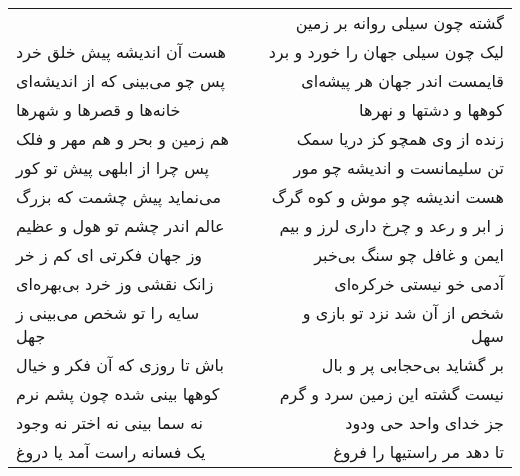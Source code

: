 \begin{center}
\begin{longtable}{l p{0.5cm} r}
&&
گشته چون سیلی روانه بر زمین
\\
هست آن اندیشه پیش خلق خرد
&&
لیک چون سیلی جهان را خورد و برد
\\
پس چو می‌بینی که از اندیشه‌ای
&&
قایمست اندر جهان هر پیشه‌ای
\\
خانه‌ها و قصرها و شهرها
&&
کوهها و دشتها و نهرها
\\
هم زمین و بحر و هم مهر و فلک
&&
زنده از وی همچو کز دریا سمک
\\
پس چرا از ابلهی پیش تو کور
&&
تن سلیمانست و اندیشه چو مور
\\
می‌نماید پیش چشمت که بزرگ
&&
هست اندیشه چو موش و کوه گرگ
\\
عالم اندر چشم تو هول و عظیم
&&
ز ابر و رعد و چرخ داری لرز و بیم
\\
وز جهان فکرتی ای کم ز خر
&&
ایمن و غافل چو سنگ بی‌خبر
\\
زانک نقشی وز خرد بی‌بهره‌ای
&&
آدمی خو نیستی خرکره‌ای
\\
سایه را تو شخص می‌بینی ز جهل
&&
شخص از آن شد نزد تو بازی و سهل
\\
باش تا روزی که آن فکر و خیال
&&
بر گشاید بی‌حجابی پر و بال
\\
کوهها بینی شده چون پشم نرم
&&
نیست گشته این زمین سرد و گرم
\\
نه سما بینی نه اختر نه وجود
&&
جز خدای واحد حی ودود
\\
یک فسانه راست آمد یا دروغ
&&
تا دهد مر راستیها را فروغ
\\
\end{longtable}
\end{center}
